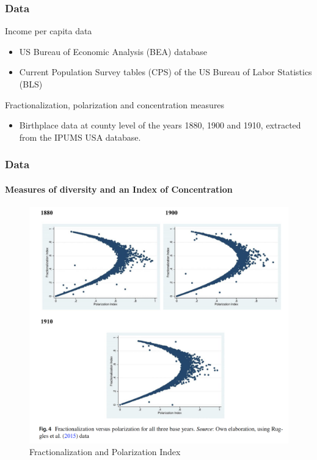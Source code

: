 \documentclass[pdftex,12pt,xcolor=pdftex,table]{beamer}
\begin{document}
\begin{frame}
\frametitle{Data}

\small{
\begin{block}{Income per capita data}
\begin{itemize}
\item US Bureau of Economic Analysis (BEA) database
\item Current Population Survey tables (CPS) of the US Bureau of Labor Statistics (BLS)
\end{itemize}
\end{block}

\begin{block}{Fractionalization, polarization and concentration measures}
\begin{itemize}
\item Birthplace data at county level of the years 1880, 1900 and 1910, extracted from the IPUMS USA database.
\end{itemize}
\end{block}
}

\end{frame}


\begin{frame}
\frametitle{Data}
\framesubtitle{Measures of diversity and an Index of Concentration}

\begin{figure}
	\begin{center}
	 \caption{\textmd{Fractionalization and Polarization Index}}
	\includegraphics[scale=0.2]{measures.png} 
	\end{center}
\end{figure}

\end{frame}
\end{document}
